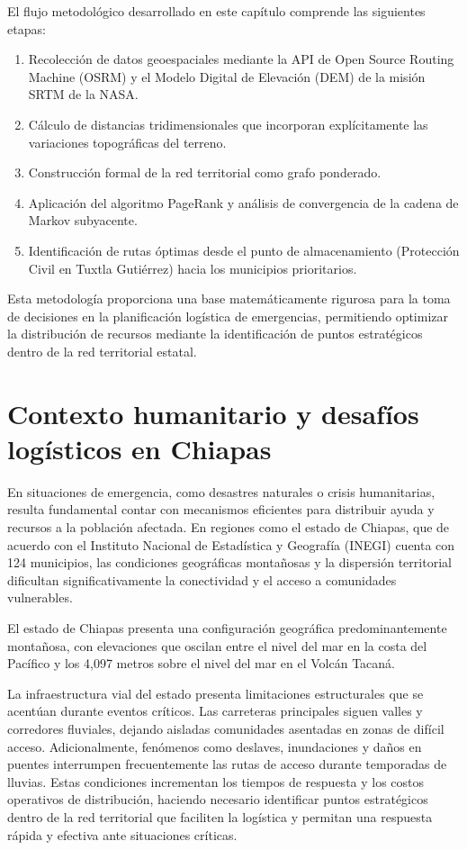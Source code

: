 \documentclass[
  spanish,
  us-letterpaper,
]{scrreprt}
\providecommand{\tightlist}{%
  \setlength{\itemsep}{0pt}\setlength{\parskip}{0pt}}
\numberwithin{equation}{section}
\begin{document}
El flujo metodológico desarrollado en este capítulo comprende las
siguientes etapas:

\begin{enumerate}
\def\labelenumi{\arabic{enumi}.}
\tightlist
\item
  Recolección de datos geoespaciales mediante la API de Open Source
  Routing Machine (OSRM) y el Modelo Digital de Elevación (DEM) de la
  misión SRTM de la NASA.
\item
  Cálculo de distancias tridimensionales que incorporan explícitamente
  las variaciones topográficas del terreno.
\item
  Construcción formal de la red territorial como grafo ponderado.
\item
  Aplicación del algoritmo PageRank y análisis de convergencia de la
  cadena de Markov subyacente.
\item
  Identificación de rutas óptimas desde el punto de almacenamiento
  (Protección Civil en Tuxtla Gutiérrez) hacia los municipios
  prioritarios.
\end{enumerate}

Esta metodología proporciona una base matemáticamente rigurosa para la
toma de decisiones en la planificación logística de emergencias,
permitiendo optimizar la distribución de recursos mediante la
identificación de puntos estratégicos dentro de la red territorial
estatal.

\section{Contexto humanitario y desafíos logísticos en
Chiapas}\label{contexto-humanitario-y-desafuxedos-loguxedsticos-en-chiapas}

En situaciones de emergencia, como desastres naturales o crisis
humanitarias, resulta fundamental contar con mecanismos eficientes para
distribuir ayuda y recursos a la población afectada. En regiones como el
estado de Chiapas, que de acuerdo con el Instituto Nacional de
Estadística y Geografía (INEGI) cuenta con 124 municipios, las
condiciones geográficas montañosas y la dispersión territorial
dificultan significativamente la conectividad y el acceso a comunidades
vulnerables.

El estado de Chiapas presenta una configuración geográfica
predominantemente montañosa, con elevaciones que oscilan entre el nivel
del mar en la costa del Pacífico y los 4,097 metros sobre el nivel del
mar en el Volcán Tacaná.

La infraestructura vial del estado presenta limitaciones estructurales
que se acentúan durante eventos críticos. Las carreteras principales
siguen valles y corredores fluviales, dejando aisladas comunidades
asentadas en zonas de difícil acceso. Adicionalmente, fenómenos como
deslaves, inundaciones y daños en puentes interrumpen frecuentemente las
rutas de acceso durante temporadas de lluvias. Estas condiciones
incrementan los tiempos de respuesta y los costos operativos de
distribución, haciendo necesario identificar puntos estratégicos dentro
de la red territorial que faciliten la logística y permitan una
respuesta rápida y efectiva ante situaciones críticas.
\end{document}
